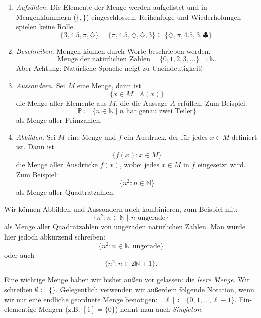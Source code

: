 \documentclass[11pt, a4paper]{article}
\theoremstyle{definition}
\theoremstyle{plain}
\numberwithin{equation}{section}
\begin{document}
\begin{enumerate}
	\item \textit{Aufzählen.} Die Elemente der Menge werden aufgelistet und in Mengenklammern (\( \{, \} \)) eingeschlossen. Reihenfolge und Wiederholungen spielen keine Rolle.
		\[
			\{ 3, 4.5, \pi, \diamondsuit \} = \{ \pi, 4.5, \diamondsuit, \diamondsuit, 3 \} \subseteq \{ \diamondsuit, \pi, 4.5, 3, \clubsuit \}. 
		\]
	\item \textit{Beschreiben.} Mengen können durch Worte beschrieben werden.
		\[
			\text{Menge der natürlichen Zahlen} = \{ 0, 1, 2, 3, \ldots \} \eqqcolon \mathbb{N}.
		\]
		Aber Achtung: Natürliche Sprache neigt zu Uneindeutigkeit!
	\item \textit{Aussondern.} Sei \( M \) eine Menge, dann ist
		\[
			\{ x \in M \mid A(x) \}
		\]
		die Menge aller Elemente aus \( M \), die die Aussage \( A \) erfüllen. Zum Beispiel:
		\[
			\mathbb{P} \coloneqq \{ n \in \mathbb{N} \mid n \text{ hat genau zwei Teiler} \}
		\]
		als Menge aller Primzahlen.
	\item \textit{Abbilden.} Sei \( M \) eine Menge und \( f \) ein Ausdruck, der für jedes \( x \in M \) definiert ist. Dann ist
		\[
			\{ f(x) : x \in M \}
		\]
		die Menge aller Ausdrücke \( f(x) \), wobei jedes \( x \in M \) in \( f \) eingesetzt wird. Zum Beispiel:
		\[
			\{ n^2 : n \in \mathbb{N} \}
		\]
		als Menge aller Quadtratzahlen.
\end{enumerate}
Wir können Abbilden und Aussondern auch kombinieren, zum Beispiel mit:
\[
	\{ n^2 : n \in \mathbb{N} \mid n \text{ ungerade} \}
\]
als Menge aller Quadratzahlen von ungeraden natürlichen Zahlen. Man würde hier jedoch abkürzend schreiben:
\[
	\{ n^2 : n \in \mathbb{N} \text{ ungerade} \}
\]
oder auch
\[
	\{ n^2 : n \in 2\mathbb{N}+1 \}.
\]

Eine wichtige Menge haben wir bisher außen vor gelassen: die \textit{leere Menge}. Wir schreiben \( \emptyset \coloneqq \{ \} \). Gelegentlich verwenden wir außerdem folgende Notation, wenn wir nur eine endliche geordnete Menge benötigen: \( [\ell] \coloneqq \{ 0, 1, \ldots, \ell-1 \} \). Ein-elementige Mengen (z.B. \( [1] = \{ 0 \} \)) nennt man auch \textit{Singleton}.
\end{document}
